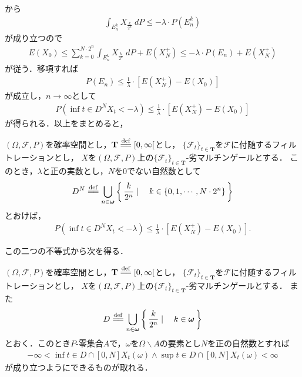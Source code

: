 	から
	\begin{align}
		\int_{E_n^k} X_{\frac{k}{2^n}}\ dP \leq -\lambda \cdot P(E_n^k)
	\end{align}
	が成り立つので
	\begin{align}
		E(X_0) \leq \sum_{k=0}^{N \cdot 2^n} \int_{E_n^k} X_{\frac{k}{2^n}}\ dP + E\left(X_N^+\right)
		\leq -\lambda \cdot P(E_n) + E\left(X_N^+\right)
	\end{align}
	が従う．移項すれば
	\begin{align}
		P\left(E_n\right)
		\leq \frac{1}{\lambda} \cdot \left[E\left(X_N^+\right) - E(X_0)\right]
	\end{align}
	が成立し，$n \longrightarrow \infty$として
	\begin{align}
		P\left(\inf{t \in D^N}{X_t} < -\lambda\right)
		\leq \frac{1}{\lambda} \cdot \left[E\left(X_N^+\right) - E(X_0)\right]
	\end{align}
	が得られる．以上をまとめると，
	
	\begin{screen}
		\begin{thm}[Doobの下限不等式]\label{thm:Doob_inf_bounded_inequality}
			$(\Omega,\mathscr{F},P)$を確率空間とし，$\mathbf{T} \defeq [0,\infty[$とし，
			$\{\mathscr{F}_t\}_{t \in \mathbf{T}}$を$\mathscr{F}$に付随するフィルトレーションとし，
			$X$を$(\Omega,\mathscr{F},P)$上の$\{\mathscr{F}_t\}_{t \in \mathbf{T}}$-劣マルチンゲールとする．
			このとき，$\lambda$と正の実数とし，$N$を$0$でない自然数として
			\begin{align}
				D^N \defeq \bigcup_{n \in \Natural} \Set{\frac{k}{2^n}}{k \in \{0,1,\cdots,N \cdot 2^n\}}
			\end{align}
			とおけば，
			\begin{align}
				P\left(\inf{t \in D^N}{X_t} < -\lambda\right)
				\leq \frac{1}{\lambda} \cdot \left[E\left(X_N^+\right) - E(X_0)\right].
			\end{align}
		\end{thm}
	\end{screen}
	
	この二つの不等式から次を得る．
	
	\begin{screen}
		\begin{thm}[劣マルチンゲールのパスは有界区間上で有界]
			$(\Omega,\mathscr{F},P)$を確率空間とし，$\mathbf{T} \defeq [0,\infty[$とし，
			$\{\mathscr{F}_t\}_{t \in \mathbf{T}}$を$\mathscr{F}$に付随するフィルトレーションとし，
			$X$を$(\Omega,\mathscr{F},P)$上の$\{\mathscr{F}_t\}_{t \in \mathbf{T}}$-劣マルチンゲールとする．
			また
			\begin{align}
				D \defeq \bigcup_{n \in \Natural} \Set{\frac{k}{2^n}}{k \in \Natural}
			\end{align}
			とおく．このとき$P$-零集合$A$で，$\omega$を$\Omega \backslash A$の要素とし$N$を正の自然数とすれば
			\begin{align}
				- \infty < \inf{t \in D \cap [0,N]}X_t(\omega) \wedge \sup{t \in D \cap [0,N]}X_t(\omega) < \infty
			\end{align}
			が成り立つようにできるものが取れる．
		\end{thm}
	\end{screen}
	
